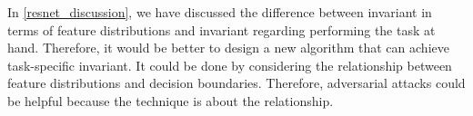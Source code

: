 In \ref{resnet_discussion}, we have discussed the difference between invariant in terms of feature distributions and invariant regarding performing the task at hand. Therefore, it would be better to design a new algorithm that can achieve task-specific invariant. It could be done by considering the relationship between feature distributions and decision boundaries. Therefore, adversarial attacks could be helpful because the technique is about the relationship. 